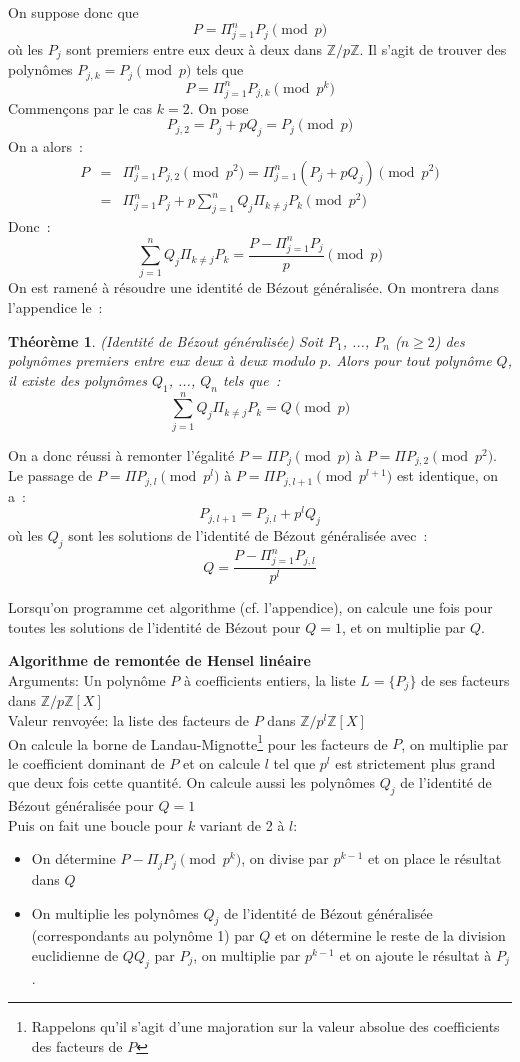 \documentclass[a4paper,11pt]{book}
\newtheorem{thm}{Théorème}
\begin{document}
\begin{giacjshere}
On suppose donc que
\[ P=\Pi_{j=1}^n P_j \pmod p \]
où les $P_j$ sont premiers entre eux deux à deux dans $\mathbb{Z}/p\mathbb{Z}$.
Il s'agit de trouver des polynômes $P_{j,k}=P_j \pmod p$ tels que
\[ P=\Pi_{j=1}^n P_{j,k} \pmod {p^k} \]
Commençons par le cas $k=2$. On pose
\[ P_{j,2}=P_j+pQ_j=P_j \pmod p \]
On a alors~:
\begin{eqnarray*}
 P&=&\Pi_{j=1}^n P_{j,2} \pmod {p^2} =\Pi_{j=1}^n (P_j+pQ_j) \pmod {p^2}\\
&=&\Pi_{j=1}^n P_j + p \sum_{j=1}^n Q_j \Pi_{k\neq j} P_k \pmod {p^2} 
\end{eqnarray*}
Donc~:
\[ \sum_{j=1}^n Q_j \Pi_{k\neq j} P_k= \frac{P-\Pi_{j=1}^n P_j}{p} \pmod p \]
On est ramené à résoudre une identité de Bézout généralisée.
On montrera dans l'appendice le~:
\begin{thm} (Identité de Bézout généralisée)
Soit $P_1$, ..., $P_n$ ($n\geq 2$) des polynômes premiers entre eux deux 
à deux modulo $p$. Alors pour tout polynôme $Q$, il existe des polynômes 
$Q_1$, ..., $Q_n$ tels que~:
\[ \sum_{j=1}^n Q_j \Pi_{k\neq j} P_k=Q \pmod p \]
\end{thm}


On a donc réussi à remonter l'égalité $P=\Pi P_j \pmod p$ à 
$P=\Pi P_{j,2} \pmod {p^2}$. Le passage de $P=\Pi P_{j,l} \pmod {p^l}$
à $P=\Pi P_{j,l+1} \pmod {p^{l+1}}$ est identique, on a~:
\[ P_{j,l+1}=P_{j,l}+p^{l}Q_j \]
où les $Q_j$ sont les solutions de l'identité de Bézout généralisée avec~:
\[ Q=\frac{P-\Pi_{j=1}^n P_{j,l}}{p^l}\]

Lorsqu'on programme cet algorithme (cf. l'appendice), 
on calcule une fois pour toutes les
solutions de l'identité de Bézout pour $Q=1$, et on multiplie par $Q$.

{\bf Algorithme de remontée de Hensel linéaire}\\
Arguments: Un polynôme $P$ à coefficients entiers, la liste $L=\{ P_j \}$ 
de ses facteurs dans $\mathbb{Z}/p\mathbb{Z}[X]$\\
Valeur renvoyée: la liste des facteurs de $P$ dans $\mathbb{Z}/p^l \mathbb{Z}[X]$\\
On calcule la borne de Landau-Mignotte\footnote{Rappelons qu'il s'agit d'une
majoration sur la valeur absolue des coefficients des facteurs de $P$} 
pour les facteurs de $P$, on multiplie
par le coefficient dominant de $P$ et on calcule $l$ tel que $p^l$ est
strictement plus grand que deux fois cette quantité. On calcule
aussi les polynômes $Q_j$ de l'identité de Bézout généralisée pour $Q=1$\\
Puis on fait une boucle pour $k$ variant de 2 à $l$:
\begin{itemize}
\item On détermine $P-\Pi_j P_j \pmod {p^{k}}$, on divise par $p^{k-1}$
et on place le résultat dans $Q$
\item On multiplie les polynômes $Q_j$ de l'identité de Bézout 
généralisée (correspondants au polynôme 1) par $Q$
et on détermine le reste de la division euclidienne de $Q Q_j$ par $P_j$,
on multiplie par $p^{k-1}$ et on ajoute le résultat à $P_j$.
\end{itemize}


\end{giacjshere}
\end{document}

